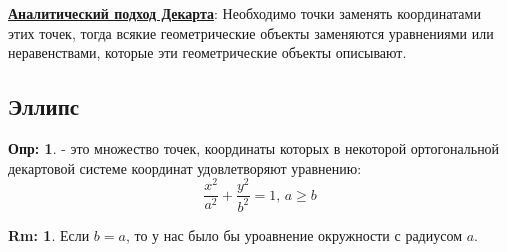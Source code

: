 \documentclass[12pt]{article}
\theoremstyle{definition}
\newtheorem{defn}{Опр:}
\newtheorem{rem}{Rm:}
\begin{document}
\textbf{\uline{Аналитический подход Декарта}}: Необходимо точки заменять координатами этих точек, тогда всякие геометрические объекты заменяются уравнениями или неравенствами, которые эти геометрические объекты описывают.

\subsection*{Эллипс}
\begin{defn}
	 - это множество точек, координаты которых в некоторой ортогональной декартовой системе координат удовлетворяют уравнению:
	$$
		\dfrac{x^2}{a^2} + \dfrac{y^2}{b^2} = 1, \, a \geq b
	$$
\end{defn}

\begin{rem}
	Если $b = a$, то у нас было бы уроавнение окружности с радиусом $a$.
\end{rem}
\end{document}
